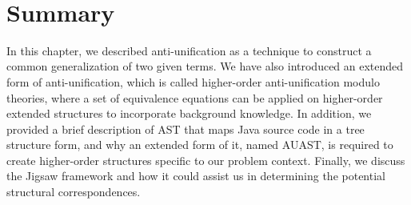  
\section{Summary}  \label{summary}
In this chapter, we described anti-unification as a technique to construct a common generalization of two given terms. We have also introduced an extended form of anti-unification, which is called higher-order anti-unification modulo theories, where a set of equivalence equations can be applied on higher-order extended structures to incorporate background knowledge. In addition,
we provided a brief description of AST that maps Java source code in a tree structure form, and why an extended form of it, named AUAST, is required to create higher-order structures specific to our problem context. Finally, we discuss the Jigsaw framework and how it could assist us in determining the potential structural correspondences.
